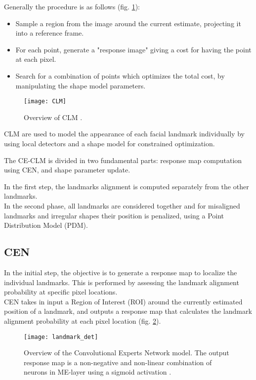 Generally the procedure is as follows (fig. \ref{fig:CLM}):
\begin{itemize}[noitemsep]
	\item Sample a region from the image around the current estimate, projecting it into a reference frame.
	\item For each point, generate a "response image" giving a cost for having the point at each pixel.
	\item Search for a combination of points which optimizes the total cost, by manipulating the shape model parameters.
\end{itemize}

\begin{figure}[H]
	\centering
	\texttt{[image: CLM]}
	\caption{Overview of CLM \cite{clm_cootes}.}
	\label{fig:CLM}
\end{figure}

CLM are used to model the appearance of each facial landmark individually by using local detectors and a shape model for constrained optimization. 

The CE-CLM is divided in two fundamental parts: response map computation using CEN, and shape parameter update.

In the first step, the landmarks alignment is computed separately from the other landmarks. \\
In the second phase, all landmarks are considered together and for misaligned landmarks and irregular shapes their position is penalized, using a Point Distribution Model (PDM).

\subsection{CEN}
In the initial step, the objective is to generate a response map to localize the individual landmarks. This is performed by assessing the landmark alignment probability at specific pixel locations. \\
CEN takes in input a Region of Interest (ROI) around the currently estimated position of a landmark, and outputs a response map that calculates the landmark alignment probability at each pixel location (fig. \ref{fig:landmark_det}).

\begin{figure}[H]
	\centering
	\texttt{[image: landmark\_det]}
	\caption{Overview of the Convolutional Experts Network model. The output response map is a non-negative and non-linear combination of neurons in ME-layer using a sigmoid activation \cite{Baltru2017}.}
	\label{fig:landmark_det}
\end{figure}

